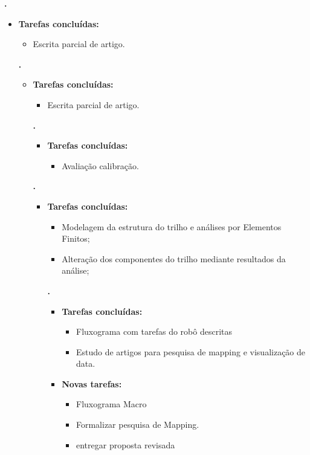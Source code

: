   
\textbf{\renan.} 
	\begin{itemize}
		\item \textbf{Tarefas concluídas:}
			\begin{itemize}    
				\item Escrita parcial de artigo.
			\end{itemize}

		
\textbf{\elael.} 
	\begin{itemize}
		\item \textbf{Tarefas concluídas:}
			\begin{itemize}    
				\item Escrita parcial de artigo.
			\end{itemize}
		
			
   \textbf{\gabriel.} 
	\begin{itemize}
		\item \textbf{Tarefas concluídas:}
			\begin{itemize}    
				\item Avaliação calibração.
			\end{itemize}
		
	\end{itemize}

			
\textbf{.} 
	\begin{itemize}
		\item \textbf{Tarefas concluídas:}
			\begin{itemize}    
				\item Modelagem da estrutura do trilho e análises por Elementos Finitos;
				\item Alteração dos componentes do trilho mediante resultados da análise;										
			\end{itemize}
												
	
		
   \textbf{\julia.} 
	\begin{itemize}
		\item \textbf{Tarefas concluídas:}
			\begin{itemize}    
				\item Fluxograma com tarefas do robô descritas
			    \item Estudo de artigos para pesquisa de mapping e visualização de data.
			\end{itemize}
		
		\item \textbf{Novas tarefas:}
			\begin{itemize} 
			 \item Fluxograma Macro
			 \item Formalizar pesquisa de Mapping.
			 \item entregar proposta revisada
			\end{itemize}
	\end{itemize}


\end{itemize}
\end{itemize}
\end{itemize}
